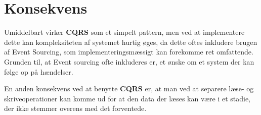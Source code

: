 \section{Konsekvens}
Umiddelbart virker \textbf{CQRS} som et simpelt pattern, men ved at implementere dette kan kompleksiteten af systemet hurtig øges, da dette oftes inkludere brugen af Event Sourcing, som implementeringsmæssigt kan forekomme ret omfattende. Grunden til, at Event sourcing ofte inkluderes er, et ønske om et system der kan følge op på hændelser. 

En anden konsekvens ved at benytte \textbf{CQRS} er, at man ved at separere læse- og skriveoperationer kan komme ud for at den data der læses kan være i et stadie, der ikke stemmer overens med det forventede.

